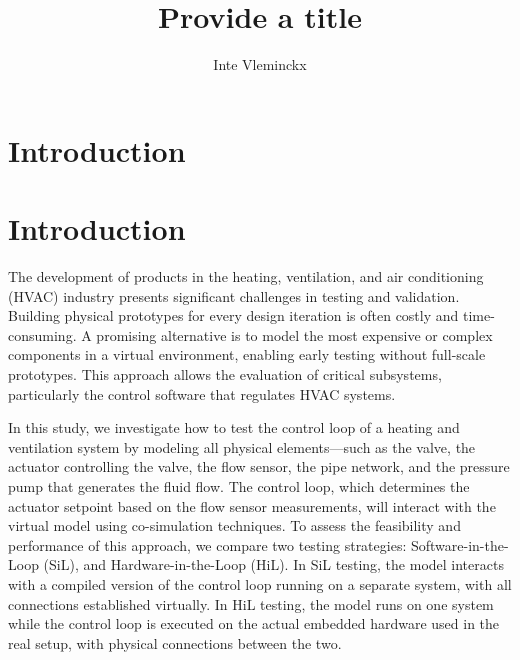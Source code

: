 \documentclass[we,final,11pt,oneside,openany]{uantwerpenbamathesis}
\title{Provide a title}
\author{Inte Vleminckx}
\begin{document}
\maketitle

\frontmatter

\tableofcontents

\mainmatter

\chapter{Introduction}
\label{ch:introduction}

\chapter{Introduction}
\label{ch:introduction}

The development of products in the heating, ventilation, and air conditioning (HVAC) industry presents significant challenges in testing and validation.
Building physical prototypes for every design iteration is often costly and time-consuming.
A promising alternative is to model the most expensive or complex components in a virtual environment, enabling early testing without full-scale prototypes.
This approach allows the evaluation of critical subsystems, particularly the control software that regulates HVAC systems.

In this study, we investigate how to test the control loop of a heating and ventilation system by modeling all physical elements—such as the valve, the actuator controlling the valve, the flow sensor, the pipe network, and the pressure pump that generates the fluid flow.
The control loop, which determines the actuator setpoint based on the flow sensor measurements, will interact with the virtual model using co-simulation techniques.
To assess the feasibility and performance of this approach, we compare two testing strategies: Software-in-the-Loop (SiL), and Hardware-in-the-Loop (HiL).
In SiL testing, the model interacts with a compiled version of the control loop running on a separate system, with all connections established virtually.
In HiL testing, the model runs on one system while the control loop is executed on the actual embedded hardware used in the real setup, with physical connections between the two.
\end{document}
